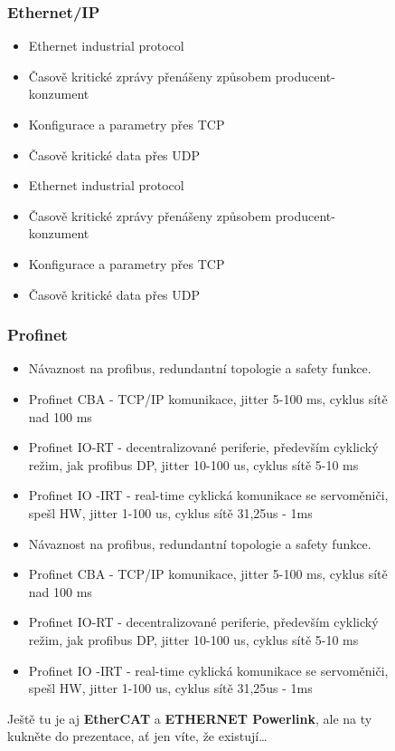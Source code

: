 \begin{figure}[h]
\subsubsection*{Ethernet/IP}
\begin{itemize}
  \item Ethernet industrial protocol
  \item Časově kritické zprávy přenášeny způsobem producent-konzument
  \item Konfigurace a parametry přes TCP 
  \item Časově kritické data přes UDP
    \item Ethernet industrial protocol
    \item Časově kritické zprávy přenášeny způsobem producent-konzument
    \item Konfigurace a parametry přes TCP
    \item Časově kritické data přes UDP
\end{itemize}

\subsubsection*{Profinet}
\begin{itemize}
  \item Návaznost na profibus, redundantní topologie a safety funkce.
  \item Profinet CBA - TCP/IP komunikace, jitter 5-100 ms, cyklus sítě nad 100 ms
  \item Profinet IO-RT - decentralizované periferie, především cyklický režim, jak profibus DP, jitter 10-100 us, cyklus sítě 5-10 ms
  \item Profinet IO -IRT - real-time cyklická komunikace se servoměniči, spešl HW, jitter 1-100 us, cyklus sítě 31,25us - 1ms
    \item Návaznost na profibus, redundantní topologie a safety funkce.
    \item Profinet CBA - TCP/IP komunikace, jitter 5-100 ms, cyklus sítě nad 100 ms
    \item Profinet IO-RT - decentralizované periferie, především cyklický režim, jak profibus DP, jitter 10-100 us, cyklus sítě 5-10 ms
    \item Profinet IO -IRT - real-time cyklická komunikace se servoměniči, spešl HW, jitter 1-100 us, cyklus sítě 31,25us - 1ms
\end{itemize}

Ještě tu je aj \textbf{EtherCAT} a \textbf{ETHERNET Powerlink}, ale na ty kukněte do prezentace, ať jen víte, že existují\dots


\end{figure}
